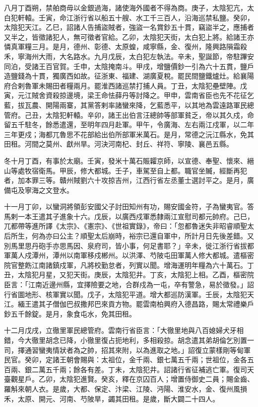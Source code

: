 \begin{pinyinscope}
 八月丁酉朔，禁舶商毋以金銀過海，諸使海外國者不得為商。庚子，太陰犯亢，太白犯軒轅。壬寅，命江浙行省以船五十艘、水工千三百人，沿海巡禁私鹽。癸卯，太陰犯天江。乙巳，詔諸人告捕盜賊者，強盜一名賞鈔五十貫，竊盜半之，應捕者又半之，皆徵諸犯人，無可徵者官給。乙卯，太陰犯天街，太白犯上將。給諸王亦憐真軍糧三月。是月，德州、彰德、太原蝗，咸寧縣，金、復州，隆興路隕霜殺禾，寧海州大雨，大名路水。九月戊辰，太白犯左執法。辛未，聖誕節，帝駐蹕安同泊，受諸王百官賀。壬申，太陰掩南斗。甲戌，增鹽價鈔一引為六十五貫，鹽戶造鹽錢為十貫，獨廣西如故。征浙東、福建、湖廣夏稅。罷民間鹽鐵爐灶。給襄陽府合剌魯軍未賜田者糧兩月。罷淮西諸巡禁打捕人員。丁丑，太陰犯壘壁陣。戊寅，元江賊舍資殺掠邊境，梁王命怯薛丹等討降之。甲申，雲南省臣也先不花征乞藍，拔瓦農、開陽兩寨，其黨答剌率諸蠻來降，乞藍悉平，以其地為雲遠路軍民總管府。己丑，太陰犯軒轅。辛卯，諸王出伯言汪總帥等部軍貧乏，帝以其久戍，命留五千駐冬，餘悉遣還，至明年四月赴軍。甲午，令廣海、左右兩江戍軍，以二年三年更戍；海都兀魯思不花部給出伯所部軍米萬石。是月，常德之沅江縣水，免其田租。河間之莫州、獻州旱。河決河南杞、封丘、祥符、寧陵、襄邑五縣。



 冬十月丁酉，有事於太廟。壬寅，發米十萬石賑糶京師，以宣德、奉聖、懷來、縉山等處牧宿衛馬。甲辰，修大都城。壬子，車駕至自上都。職官坐贓，經斷再犯者，加本罪三等。贛州賊劉六十攻掠吉州，江西行省左丞董士選討平之。是月，廣備屯及寧海之文登水。



 十一月丁卯，以蠻洞將領彭安國父子討田知州有功，賜安國金符，子為蠻夷官。答馬剌一本王遣其子進象十六。戊辰，以廣西戍軍悉隸兩江宣慰司都元帥府。己巳，兀都帶等進所譯《太宗》、《憲宗》、《世祖實錄》，帝曰：「忽都魯迷失非昭睿順聖太后所生，何為亦曰公主？順聖太后崩時，裕宗已還自軍中，所計月日先後差錯。又別馬里思丹砲手亦思馬因、泉府司，皆小事，何足書耶？」辛未，徙江浙行省拔都軍萬人戍潭州，潭州以南軍移戍郴州。以洪澤、芍陂屯田軍萬人修大都城。遣樞密院官整飭江南諸鎮戍軍，凡將校勤怠者，列實以聞。增海運明年糧為六十萬石。丁丑，太陰犯月星，又犯天街。庚辰，太陰犯井。丁亥，太陰犯上相。乙酉，樞密院臣言：「江南近邊州縣，宜擇險要之地，合群戍為一屯，卒有警急，易於徵發。」詔行省圖地形、核軍實以聞。戊子，太陰犯平道。增大都巡防漢軍。壬辰，太陰犯天江。緬王遣其子僧伽巴叔撒邦巴來貢方物。罷雲南柏興府入德昌路，賜太常禮樂戶鈔五千餘錠。是月，象食屯水，免其田租。



 十二月戊戌，立徹里軍民總管府。雲南行省臣言：「大徹里地與八百媳婦犬牙相錯，今大徹里胡念已降，小徹里復占扼地利，多相殺掠。胡念遣其弟胡倫乞別置一司，擇通習蠻夷情狀者為之帥，招其來附，以為進取之地。」詔復立蒙樣剛等甸軍民官。癸卯，定諸王朝會賜與：太祖位，金千兩、銀七萬五千兩；世祖位，金各五百兩、銀二萬五千兩；餘各有差。丁未，太陰犯井。詔諸行省征補逃亡軍。復司天臺觀星戶。乙卯，太陰犯進賢。癸亥，釋在京囚百人；增置侍御史二員；賜金齒、羅斛來朝人衣。是歲，大都、保定、汴梁、江陵、沔陽、淮安水，金、復州風損禾，太原、開元、河南、芍陂旱，蠲其田租。是歲，斷大闢二十四人。




\end{pinyinscope}
